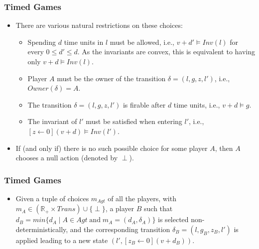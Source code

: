 \documentclass{beamer}
\begin{document}
\begin{frame}
\frametitle{Timed Games}
\begin{itemize}
\item There are various natural restrictions on these choices:
\begin{itemize}
\item Spending $d$ time units in $l$ must be allowed, i.e., $v + d' \models Inv(l)$ for every $0 \leq d' \leq d$. As the invariants are convex, this is equivalent to having only $v + d \models Inv(l)$.
\item Player $A$ must be the owner of the transition $\delta = (l, g, z, l')$, i.e., $Owner(\delta) = A$.
\item The transition $\delta = (l, g, z, l')$ is firable after $d$ time units, i.e., $v + d \models g$.
\item The invariant of $l'$ must be satisfied when entering $l'$, i.e., $[z \leftarrow 0](v + d) \models Inv(l')$.
\end{itemize}
\item If (and only if) there is no such possible choice for some player $A$, then $A$ chooses a null action (denoted by $\perp$).
\end{itemize}
\end{frame}

\begin{frame}
\frametitle{Timed Games}
\begin{itemize}
\item Given a tuple of choices $m_{Agt}$ of all the players, with $m_{A} \in (\mathbb{R}_{+} \times Trans) \cup \lbrace \perp \rbrace$, a player $B$ such that $d_{B} = min\lbrace d_{A} \; \vert \; A \in Agt \; \text{and} \; m_{A} = (d_{A}, \delta_{A}) \rbrace$ is selected non-deterministically, and the corresponding transition $\delta_{B} = (l, g_{B}, z_{B}, l')$ is applied leading to a new state $(l', [z_{B} \leftarrow 0](v + d_{B}))$.
\end{itemize}
\end{frame}
\end{document}
